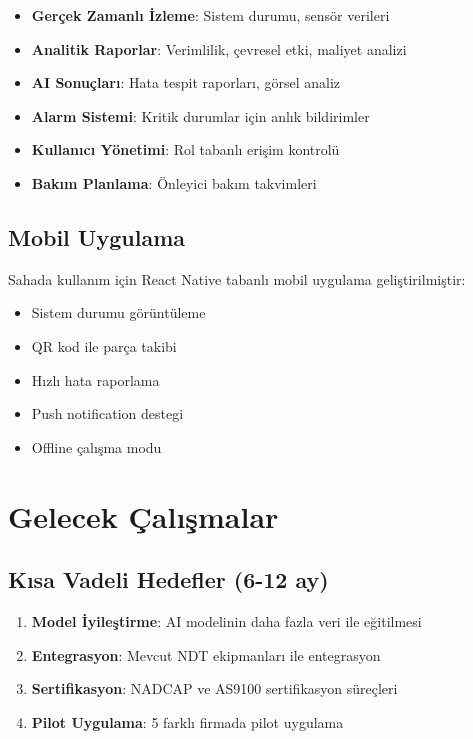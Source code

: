 \documentclass[12pt,a4paper]{article}
\begin{document}
\begin{itemize}
    \item \textbf{Gerçek Zamanlı İzleme}: Sistem durumu, sensör verileri
    \item \textbf{Analitik Raporlar}: Verimlilik, çevresel etki, maliyet analizi
    \item \textbf{AI Sonuçları}: Hata tespit raporları, görsel analiz
    \item \textbf{Alarm Sistemi}: Kritik durumlar için anlık bildirimler
    \item \textbf{Kullanıcı Yönetimi}: Rol tabanlı erişim kontrolü
    \item \textbf{Bakım Planlama}: Önleyici bakım takvimleri
\end{itemize}

\subsection{Mobil Uygulama}

Sahada kullanım için React Native tabanlı mobil uygulama geliştirilmiştir:

\begin{itemize}
    \item Sistem durumu görüntüleme
    \item QR kod ile parça takibi
    \item Hızlı hata raporlama
    \item Push notification destegi
    \item Offline çalışma modu
\end{itemize}

\section{Gelecek Çalışmalar}

\subsection{Kısa Vadeli Hedefler (6-12 ay)}

\begin{enumerate}
    \item \textbf{Model İyileştirme}: AI modelinin daha fazla veri ile eğitilmesi
    \item \textbf{Entegrasyon}: Mevcut NDT ekipmanları ile entegrasyon
    \item \textbf{Sertifikasyon}: NADCAP ve AS9100 sertifikasyon süreçleri
    \item \textbf{Pilot Uygulama}: 5 farklı firmada pilot uygulama
\end{enumerate}
\end{document}
